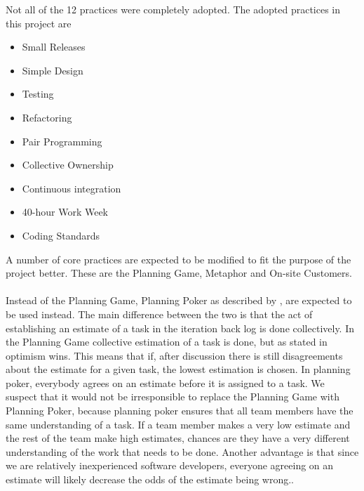 Not all of the 12 practices were completely adopted. The adopted practices in this project are\\

\begin{itemize}
\item Small Releases
\item Simple Design
\item Testing
\item Refactoring
\item Pair Programming
\item Collective Ownership
\item Continuous integration
\item 40-hour Work Week
\item Coding Standards
\end{itemize}

A number of core practices are expected to be modified to fit the purpose of the project better. These are the Planning Game, Metaphor and On-site Customers.\\\\

Instead of the Planning Game, Planning Poker as described by \citep{xp:planningPoker} , are expected to be used instead. The main difference between the two is that the act of establishing an estimate of a task in the iteration back log is done collectively. In the Planning Game collective estimation of a task is done, but as stated in \citep[p. 58]{xp:planning} optimism wins. This means that if, after discussion there is still disagreements about the estimate for a given task, the lowest estimation is chosen. In planning poker, everybody agrees on an estimate before it is assigned to a task. We suspect that it would not be irresponsible to replace the Planning Game with Planning Poker, because planning poker ensures that all team members have the same understanding of a task. If a team member makes a very low estimate and the rest of the team make high estimates, chances are they have a very different understanding of the work that needs to be done. Another advantage is that since we are relatively inexperienced software developers, everyone agreeing on an estimate will likely decrease the odds of the estimate being wrong..\\\\

